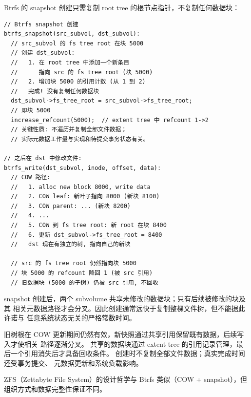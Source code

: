 \begin{filesystemlayout}

Btrfs 的 snapshot 创建只需复制 root tree 的根节点指针，不复制任何数据块：

\begin{lstlisting}
// Btrfs snapshot 创建
btrfs_snapshot(src_subvol, dst_subvol):
  // src_subvol 的 fs tree root 在块 5000
  // 创建 dst_subvol:
  //   1. 在 root tree 中添加一个新条目
  //      指向 src 的 fs tree root (块 5000)
  //   2. 增加块 5000 的引用计数 (从 1 到 2)
  //   完成! 没有复制任何数据块
  dst_subvol->fs_tree_root = src_subvol->fs_tree_root;
  // 即块 5000
  increase_refcount(5000);  // extent tree 中 refcount 1->2
  // 关键性质: 不遍历并复制全部文件数据；
  // 实际元数据工作量与实现和待提交事务状态有关。

// 之后在 dst 中修改文件:
btrfs_write(dst_subvol, inode, offset, data):
  // COW 路径:
  //   1. alloc new block 8000, write data
  //   2. COW leaf: 新叶子指向 8000 (新块 8100)
  //   3. COW parent: ... (新块 8200)
  //   4. ...
  //   5. COW 到 fs tree root: 新 root 在块 8400
  //   6. 更新 dst_subvol->fs_tree_root = 8400
  //   dst 现在有独立的树, 指向自己的新块

  // src 的 fs tree root 仍然指向块 5000
  // 块 5000 的 refcount 降回 1 (被 src 引用)
  // 旧数据块 (5000 的子树) 仍被 src 引用, 不回收
\end{lstlisting}

snapshot 创建后，两个 subvolume 共享未修改的数据块；只有后续被修改的块及其
相关元数据路径才会分叉。因此创建通常远快于复制整棵文件树，但不能据此许诺与
任意系统状态无关的严格常数时间。

旧树根在 COW 更新期间仍然有效，新快照通过共享引用保留既有数据，后续写入才使相关
路径逐渐分叉。
共享的数据块通过 extent tree 的引用记录管理，最后一个引用消失后才具备回收条件。
创建时不复制全部文件数据；真实完成时间还受事务提交、
元数据更新和系统负载影响。


ZFS（Zettabyte File System）的设计哲学与 Btrfs 类似（COW + snapshot），但组织方式和数据完整性保证不同。


\end{filesystemlayout}
